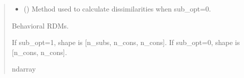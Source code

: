 \documentclass[letterpaper,10pt,english]{sphinxhowto}
\begin{document}
\begin{fulllineitems}
\begin{quote}
\begin{description}
\begin{itemize}
\begin{itemize}
\item {} 
: average trials and use subjects as features.

\end{itemize}


\item {} 
\sphinxAtStartPar
{} (\sphinxstyleliteralemphasis{\sphinxupquote{, }}\sphinxstyleliteralemphasis{\sphinxupquote{, }}) \textendash{} Method used to calculate dissimilarities when sub\_opt=0.

\end{itemize}

\sphinxAtStartPar

\sphinxAtStartPar
{} \textendash{} Behavioral RDMs.

\sphinxAtStartPar
If sub\_opt=1, shape is {[}n\_subs, n\_cons, n\_cons{]}.
If sub\_opt=0, shape is {[}n\_cons, n\_cons{]}.


\sphinxAtStartPar
ndarray

\end{description}\end{quote}

\end{fulllineitems}

\end{document}
